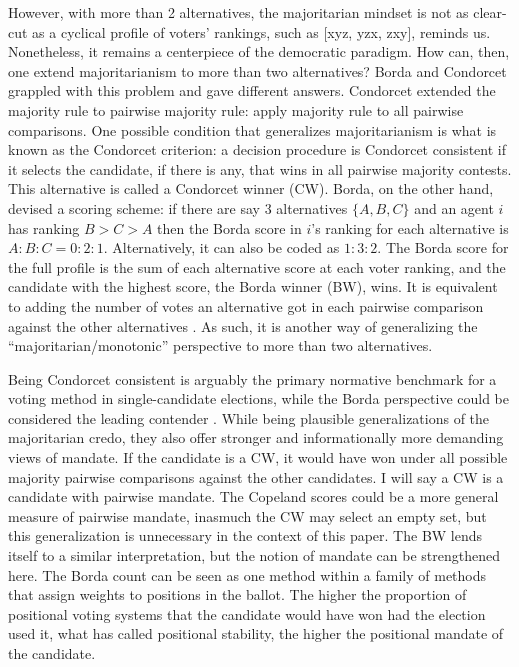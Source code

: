 \documentclass[hidelinks,11pt]{article} \usepackage[utf8]{inputenc}
\begin{document}
However, with more than 2 alternatives, the majoritarian mindset is not as
clear-cut as a cyclical profile of voters' rankings, such as [xyz, yzx, zxy],
reminds us. Nonetheless, it remains a centerpiece of the democratic paradigm.
How can, then, one extend majoritarianism to more than two alternatives? Borda
and Condorcet grappled with this problem and gave different answers. Condorcet
extended the majority rule to pairwise majority rule: apply majority rule to all
pairwise comparisons. One possible condition that generalizes majoritarianism is
what is known as the Condorcet criterion: a decision procedure is Condorcet
consistent if it selects the candidate, if there is any, that wins in all
pairwise majority contests. This alternative is called a Condorcet winner (CW).
Borda, on the other hand, devised a scoring scheme: if there are say 3
alternatives \(\{A,B,C\}\) and an agent \(i\) has ranking \(B>C>A\) then the
Borda score in \(i\)'s ranking for each alternative is \(A:B:C = 0:2:1\).
Alternatively, it can also be coded as \(1:3:2\). The Borda score for the full
profile is the sum of each alternative score at each voter ranking, and the
candidate with the highest score, the Borda winner (BW), wins. It is equivalent
to adding the number of votes an alternative got in each pairwise comparison
against the other alternatives \parencite{nurmi1999voting}. As such, it is
another way of generalizing the ``majoritarian/monotonic'' perspective to more
than two alternatives.

Being Condorcet consistent is arguably the primary normative benchmark for a
voting method in single-candidate elections, while the Borda perspective could
be considered the leading contender \parencite{regenwetter2006behavioral,
  felsenthal2011review, nurmi2002voting}. While being plausible generalizations
of the majoritarian credo, they also offer stronger and informationally more
demanding views of mandate. If the candidate is a CW, it would have won under
all possible majority pairwise comparisons against the other candidates. I will
say a CW is a candidate with pairwise mandate. The Copeland scores could be a
more general measure of pairwise mandate, inasmuch the CW may select an empty
set, but this generalization is unnecessary in the context of this paper. The BW
lends itself to a similar interpretation, but the notion of mandate can be
strengthened here. The Borda count can be seen as one method within a family of
methods that assign weights to positions in the ballot. The higher the
proportion of positional voting systems that the candidate would have won had
the election used it, what \textcite{tabarrok2001president} has called
positional stability, the higher the positional mandate of the candidate.
\end{document}
